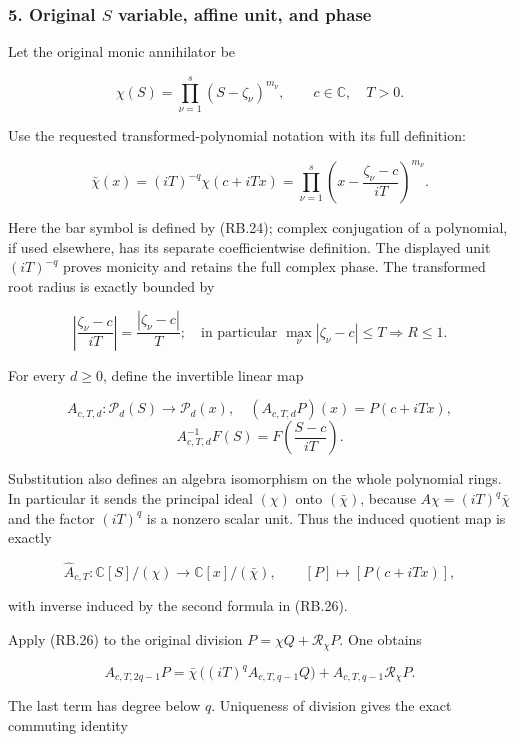 \subsubsection{\texorpdfstring{5. Original \(S\) variable, affine unit, and phase}{5. Original  variable, affine unit, and phase}}\label{endpoint-relation_balance_original--original-s-variable-affine-unit-and-phase}

Let the original monic annihilator be

\[
\chi(S)=\prod_{\nu=1}^{s}(S-\zeta_\nu)^{m_\nu},
\qquad c\in\mathbb C,\quad T>0.
\tag{RB.23}
\]

Use the requested transformed-polynomial notation with its full definition:

\[
\boxed{
\bar\chi(x)=(iT)^{-q}\chi(c+iTx)
=\prod_{\nu=1}^{s}\left(x-\frac{\zeta_\nu-c}{iT}\right)^{m_\nu}.}
\tag{RB.24}
\]

Here the bar symbol is defined by (RB.24); complex conjugation of a polynomial, if used elsewhere, has its separate coefficientwise definition. The displayed unit \((iT)^{-q}\) proves monicity and retains the full complex phase. The transformed root radius is exactly bounded by

\[
\left|\frac{\zeta_\nu-c}{iT}\right|
=\frac{|\zeta_\nu-c|}{T};
\quad\text{in particular }\max_\nu|\zeta_\nu-c|\leq T
\Longrightarrow R\leq1.
\tag{RB.25}
\]

For every \(d\geq0\), define the invertible linear map

\[
A_{c,T,d}:\mathcal P_d(S)\longrightarrow\mathcal P_d(x),
\quad (A_{c,T,d}P)(x)=P(c+iTx),
\] \[
A_{c,T,d}^{-1}F(S)=F\left(\frac{S-c}{iT}\right).
\tag{RB.26}
\]

Substitution also defines an algebra isomorphism on the whole polynomial rings. In particular it sends the principal ideal \((\chi)\) onto \((\bar\chi)\), because \(A\chi=(iT)^q\bar\chi\) and the factor \((iT)^q\) is a nonzero scalar unit. Thus the induced quotient map is exactly

\[
\widehat A_{c,T}:\mathbb C[S]/(\chi)\longrightarrow\mathbb C[x]/(\bar\chi),
\qquad [P]\longmapsto[P(c+iTx)],
\tag{RB.27}
\]

with inverse induced by the second formula in (RB.26).

Apply (RB.26) to the original division \(P=\chi Q+\mathcal R_\chi P\). One obtains

\[
A_{c,T,2q-1}P
=\bar\chi\,\big((iT)^q A_{c,T,q-1}Q\big)
 +A_{c,T,q-1}\mathcal R_\chi P.
\tag{RB.28}
\]

The last term has degree below \(q\). Uniqueness of division gives the exact commuting identity

